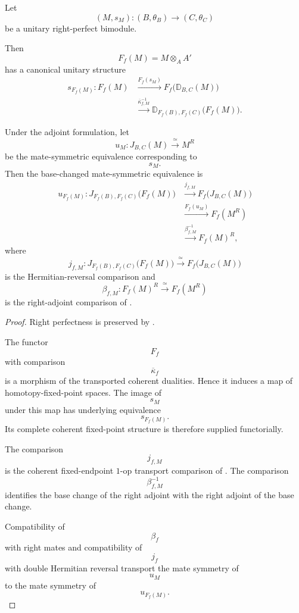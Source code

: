 \begin{proposition}
\label{prop:base-change-unitary-bimodules}
Let
\[
    (M,s_M)
    \colon
    (B,\theta_B)
    \longrightarrow
    (C,\theta_C)
\]
be a unitary right-perfect bimodule.

Then
\[
    F_f(M)
    =
    M\otimes_AA'
\]
has a canonical unitary structure
\[
\begin{aligned}
    s_{F_f(M)}
    \colon
    F_f(M)
    &\xrightarrow{
        F_f(s_M)
    }
    F_f
    \bigl(
        \mathbb D_{B,C}(M)
    \bigr)
    \\
    &\xrightarrow{
        \overline\kappa_{f,M}^{-1}
    }
    \mathbb D_{F_f(B),F_f(C)}
    \bigl(
        F_f(M)
    \bigr).
\end{aligned}
\]

Under the adjoint formulation, let
\[
    u_M
    \colon
    J_{B,C}(M)
    \xrightarrow{\;\simeq\;}
    M^R
\]
be the mate-symmetric equivalence corresponding to
\[
    s_M.
\]
Then the base-changed mate-symmetric equivalence is
\[
\begin{aligned}
    u_{F_f(M)}
    \colon
    J_{F_f(B),F_f(C)}
    \bigl(
        F_f(M)
    \bigr)
    &\xrightarrow{
        j_{f,M}
    }
    F_f
    \bigl(
        J_{B,C}(M)
    \bigr)
    \\
    &\xrightarrow{
        F_f(u_M)
    }
    F_f(M^R)
    \\
    &\xrightarrow{
        \beta_{f,M}^{-1}
    }
    F_f(M)^R,
\end{aligned}
\]
where
\[
    j_{f,M}
    \colon
    J_{F_f(B),F_f(C)}
    \bigl(
        F_f(M)
    \bigr)
    \xrightarrow{\;\simeq\;}
    F_f
    \bigl(
        J_{B,C}(M)
    \bigr)
\]
is the Hermitian-reversal comparison and
\[
    \beta_{f,M}
    \colon
    F_f(M)^R
    \xrightarrow{\;\simeq\;}
    F_f(M^R)
\]
is the right-adjoint comparison of
.
\end{proposition}

\begin{proof}
Right perfectness is preserved by
.

The functor
\[
    F_f
\]
with comparison
\[
    \overline\kappa_f
\]
is a morphism of the transported coherent dualities. Hence it induces a
map of homotopy-fixed-point spaces. The image of
\[
    s_M
\]
under this map has underlying equivalence
\[
    s_{F_f(M)}.
\]
Its complete coherent fixed-point structure is therefore supplied
functorially.

The comparison
\[
    j_{f,M}
\]
is the coherent fixed-endpoint $1$-op transport comparison of
.
The comparison
\[
    \beta_{f,M}^{-1}
\]
identifies the base change of the right adjoint with the right adjoint of
the base change.

Compatibility of
\[
    \beta_f
\]
with right mates and compatibility of
\[
    j_f
\]
with double Hermitian reversal transport the mate symmetry of
\[
    u_M
\]
to the mate symmetry of
\[
    u_{F_f(M)}.
\]
\end{proof}

